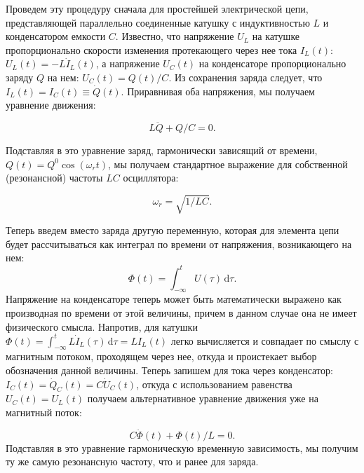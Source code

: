 \documentclass[14pt, a4paper]{extreport}
\newcommand{\diff}{\,\mathrm{d}}
\numberwithin{equation}{section}
\begin{document}
Проведем эту процедуру сначала для простейшей электрической цепи, представляющей параллельно соединенные катушку с индуктивностью $L$ и конденсатором емкости $C$. Известно, что напряжение $U_L$ на катушке пропорционально скорости изменения протекающего через нее тока $I_L(t)$: $U_L(t) = - L \dot I_L(t)$, а напряжение $U_C(t)$ на конденсаторе пропорционально заряду $Q$ на нем: $U_C(t) = Q(t)/C$. Из сохранения заряда следует, что $I_L(t) = I_C(t) \equiv \dot Q(t)$. Приравнивая оба напряжения, мы получаем уравнение движения:

\begin{equation}
L \ddot Q + Q/C = 0.
\end{equation}

Подставляя в это уравнение заряд, гармонически зависящий от времени, $Q(t) = Q^0 \cos(\omega_r t)$, мы получаем стандартное выражение для собственной (резонансной) частоты $LC$ осциллятора:

\begin{equation}
	\omega_r = \sqrt{1/LC}.
\end{equation}

Теперь введем вместо заряда другую переменную, которая для элемента цепи будет рассчитываться как интеграл по времени от напряжения, возникающего на нем:
\begin{equation}
	\Phi(t) = \int_{-\infty}^{t} U(\tau) \diff \tau.\label{eq:phi_variable}
\end{equation}
Напряжение на конденсаторе теперь может быть математически выражено как производная по времени от этой величины, причем в данном случае она не имеет физического смысла. Напротив, для катушки $\Phi(t) = \int_{-\infty}^{t} L \dot I_L(\tau) \diff \tau = LI_L(t)	$  легко вычисляется и совпадает по смыслу с магнитным потоком, проходящем через нее, откуда и проистекает выбор обозначения данной величины. Теперь запишем для тока через конденсатор: $I_C(t) = \dot Q_C(t) = C \dot U_C(t)$, откуда с использованием равенства $U_C(t) = U_L(t)$ получаем альтернативное уравнение движения уже на магнитный поток:

\begin{equation}
	C \ddot \Phi(t) + \Phi(t)/L = 0.
\end{equation}
Подставляя в это уравнение гармоническую временную зависимость, мы получим ту же самую резонансную частоту, что и ранее для заряда.
\end{document}
